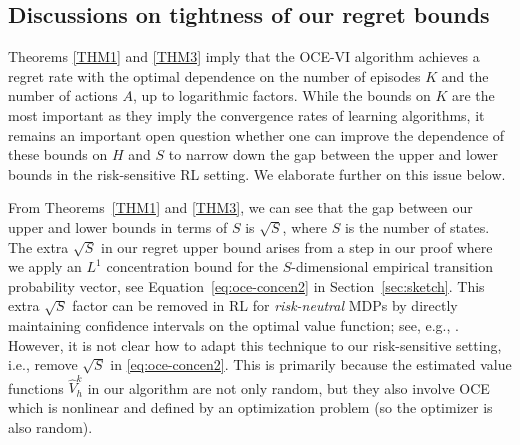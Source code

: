 \documentclass[11pt]{article}
\newtheorem{remark}{Remark}
\newcommand{\1}{\mathbbm{1}}
\newcommand{\gao}[1]{\textcolor{blue}{{#1}}} %
\begin{document}
\subsection{Discussions on tightness of our regret bounds}





Theorems \ref{THM1} and \ref{THM3} imply that the OCE-VI algorithm achieves a regret rate with the optimal dependence on the number of episodes $K$ and the number of actions $A$, up to logarithmic factors. While the bounds on
$K$ are the most important as they imply the convergence rates of learning algorithms, it remains an important open question whether one can improve the dependence of these bounds on $H$ and $S$ to narrow down the gap between the upper and lower bounds in the risk-sensitive RL setting. We elaborate further on this issue below. 


From Theorems~\ref{THM1} and \ref{THM3},  we can see that the gap between our upper and lower bounds in terms of $S$ is $\sqrt{S}$, where $S$ is the number of states. The extra $\sqrt{S}$ in our regret upper bound arises from a step in our proof where we apply an $L^1$ concentration bound for the $S$-dimensional empirical transition probability vector, see Equation~\eqref{eq:oce-concen2} in Section~\ref{sec:sketch}. This extra $\sqrt{S}$ factor can be removed in RL for \textit{risk-neutral} MDPs by directly maintaining confidence intervals on the optimal value function; see, e.g., \cite{azar2017minimax, zanette2019tighter}. However, it is not clear how to adapt this technique to our risk-sensitive setting, i.e., remove $\sqrt{S}$ in \eqref{eq:oce-concen2}. This is primarily because the estimated value functions $\hat V^k_h$ in our algorithm are not only random, but they also involve OCE which is nonlinear and defined by an optimization problem (so the optimizer is also random). 
\end{document}
